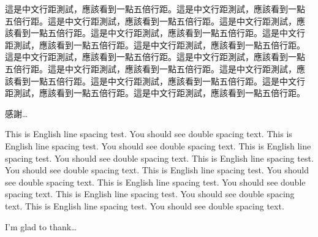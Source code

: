 \begin{acknowledgementszh}
這是中文行距測試，應該看到一點五倍行距。這是中文行距測試，應該看到一點
五倍行距。這是中文行距測試，應該看到一點五倍行距。這是中文行距測試，應
該看到一點五倍行距。這是中文行距測試，應該看到一點五倍行距。這是中文行
距測試，應該看到一點五倍行距。這是中文行距測試，應該看到一點五倍行距。
這是中文行距測試，應該看到一點五倍行距。這是中文行距測試，應該看到一點
五倍行距。這是中文行距測試，應該看到一點五倍行距。這是中文行距測試，應
該看到一點五倍行距。這是中文行距測試，應該看到一點五倍行距。這是中文行
距測試，應該看到一點五倍行距。這是中文行距測試，應該看到一點五倍行距。

感謝\ldots
\end{acknowledgementszh}

\begin{acknowledgementsen}
This is English line spacing test. You should see double spacing text.
This is English line spacing test. You should see double spacing text.
This is English line spacing test. You should see double spacing text.
This is English line spacing test. You should see double spacing text.
This is English line spacing test. You should see double spacing text.
This is English line spacing test. You should see double spacing text.
This is English line spacing test. You should see double spacing text.
This is English line spacing test. You should see double spacing text.

I'm glad to thank\ldots 
\end{acknowledgementsen}
